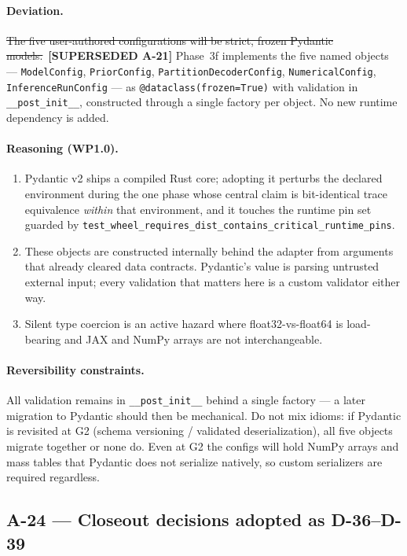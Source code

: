 \documentclass[
  10pt,
]{article}
\providecommand{\tightlist}{%
  \setlength{\itemsep}{0pt}\setlength{\parskip}{0pt}}
\newcommand{\amdstrike}[1]{\sout{#1}}
\newcommand{\amdstrike}[1]{\textcolor{supcolor}{#1}}
\newcommand{\supsd}[2]{{\color{supcolor}\amdstrike{#2}}~{\color{amdcolor}\footnotesize\textbf{[SUPERSEDED #1]}}}
\begin{document}
\paragraph{Deviation.}
\supsd{A-21}{The five user-authored configurations will be strict, frozen Pydantic models.}
Phase~3f implements the five named objects --- \texttt{ModelConfig}, \texttt{PriorConfig}, \texttt{PartitionDecoderConfig}, \texttt{NumericalConfig}, \texttt{InferenceRunConfig} --- as \texttt{@dataclass(frozen=True)} with validation in \texttt{\_\_post\_init\_\_}, constructed through a single factory per object. No new runtime dependency is added.

\paragraph{Reasoning (WP1.0).}
\begin{enumerate}
\tightlist
\item Pydantic v2 ships a compiled Rust core; adopting it perturbs the declared environment during the one phase whose central claim is bit-identical trace equivalence \emph{within} that environment, and it touches the runtime pin set guarded by \texttt{test\_wheel\_requires\_dist\_contains\_critical\_runtime\_pins}.
\item These objects are constructed internally behind the adapter from arguments that already cleared data contracts. Pydantic's value is parsing untrusted external input; every validation that matters here is a custom validator either way.
\item Silent type coercion is an active hazard where float32-vs-float64 is load-bearing and JAX and NumPy arrays are not interchangeable.
\end{enumerate}

\paragraph{Reversibility constraints.}
All validation remains in \texttt{\_\_post\_init\_\_} behind a single factory --- a later migration to Pydantic should then be mechanical. Do not mix idioms: if Pydantic is revisited at G2 (schema versioning / validated deserialization), all five objects migrate together or none do. Even at G2 the configs will hold NumPy arrays and mass tables that Pydantic does not serialize natively, so custom serializers are required regardless.


\hypertarget{a-24}{%
\subsection{A-24 --- Closeout decisions adopted as D-36--D-39}\label{a-24}}
\end{document}
